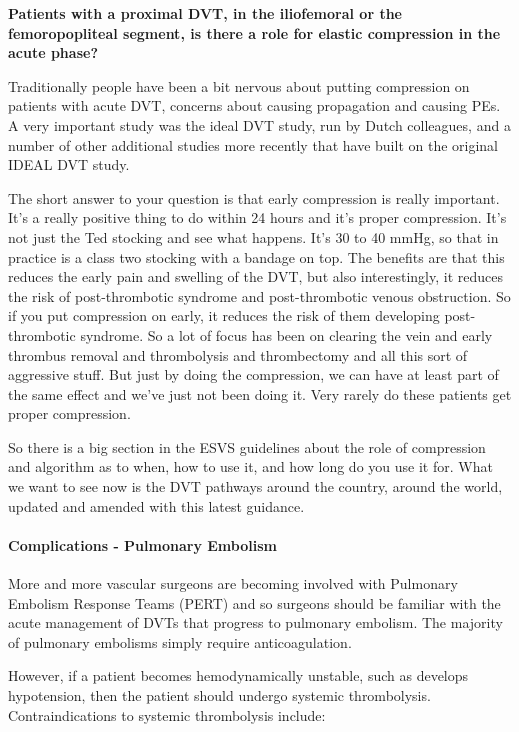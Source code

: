 \documentclass[
]{book}
\begin{document}
\textbf{Patients with a proximal DVT, in the iliofemoral or the
femoropopliteal segment, is there a role for elastic compression in the
acute phase?}

Traditionally people have been a bit nervous about putting compression
on patients with acute DVT, concerns about causing propagation and
causing PEs. A very important study was the ideal DVT
study\citep{tencate-hoek2018}, run by Dutch colleagues, and a number of other
additional studies more recently that have built on the original IDEAL
DVT study.\citep{schreurs2022}

The short answer to your question is that early compression is really
important. It's a really positive thing to do within 24 hours and it's
proper compression. It's not just the Ted stocking and see what happens.
It's 30 to 40 mmHg, so that in practice is a class two stocking with a
bandage on top. The benefits are that this reduces the early pain and
swelling of the DVT, but also interestingly, it reduces the risk of
post-thrombotic syndrome and post-thrombotic venous obstruction. So if
you put compression on early, it reduces the risk of them developing
post-thrombotic syndrome. So a lot of focus has been on clearing the
vein and early thrombus removal and thrombolysis and thrombectomy and
all this sort of aggressive stuff. But just by doing the compression, we
can have at least part of the same effect and we've just not been doing
it. Very rarely do these patients get proper compression.

So there is a big section in the ESVS guidelines about the role of
compression and algorithm as to when, how to use it, and how long do you
use it for. What we want to see now is the DVT pathways around the
country, around the world, updated and amended with this latest
guidance.\citep{kakkos2021}

\hypertarget{complications---pulmonary-embolism}{%
\paragraph{Complications - Pulmonary Embolism}\label{complications---pulmonary-embolism}}

More and more vascular surgeons are becoming involved with Pulmonary
Embolism Response Teams (PERT) and so surgeons should be familiar with
the acute management of DVTs that progress to pulmonary embolism. The
majority of pulmonary embolisms simply require anticoagulation.

However, if a patient becomes hemodynamically unstable, such as develops
hypotension, then the patient should undergo systemic
thrombolysis.\citep{kearon2016} Contraindications to systemic thrombolysis
include:
\end{document}

